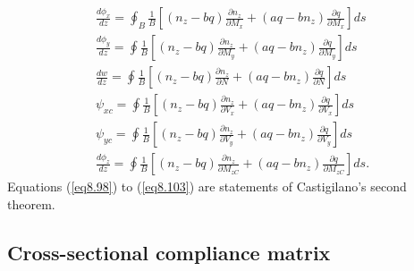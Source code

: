 \documentclass{AeroStructure-ERJohnson}
\begin{document}
\begin{gather}
\frac{d \phi_{x}}{d z}=\oint_{B} \frac{1}{B}\left[\left(n_{z}-b
q\right) \frac{\partial n_{z}}{\partial M_{x}}+\left(a q-b
n_{z}\right) \frac{\partial q}{\partial M_{x}}\right] d
s\label{eq8.98}\\
\frac{d \phi_{y}}{d z}=\oint \frac{1}{B}\left[\left(n_{z}-b
q\right) \frac{\partial n_{z}}{\partial M_{y}}+\left(a q-b
n_{z}\right) \frac{\partial q}{\partial M_{y}}\right] d
s\label{eq8.99}\\
\frac{d w}{d z}=\oint \frac{1}{B}\left[\left(n_{z}-b q\right)
\frac{\partial n_{z}}{\partial N}+\left(a q-b n_{z}\right)
\frac{\partial q}{\partial N}\right] d s\label{eq8.100}\\
\psi_{x c}=\oint \frac{1}{B}\left[\left(n_{z}-b q\right)
\frac{\partial n_{z}}{\partial V_{x}}+\left(a q-b n_{z}\right)
\frac{\partial q}{\partial V_{x}}\right] d s\label{eq8.101}\\
\psi_{y c}=\oint \frac{1}{B}\left[\left(n_{z}-b q\right)
\frac{\partial n_{z}}{\partial V_{y}}+\left(a q-b n_{z}\right)
\frac{\partial q}{\partial V_{y}}\right] d s\label{eq8.102}\\
\frac{d \phi_{z}}{d z}=\oint \frac{1}{B}\left[\left(n_{z}-b
q\right) \frac{\partial n_{z}}{\partial M_{z C}}+\left(a q-b
n_{z}\right) \frac{\partial q}{\partial M_{z C}}\right] d
s.\label{eq8.103}
\end{gather}
Equations (\ref{eq8.98}) to (\ref{eq8.103}) are statements of
Castigilano's second theorem.

\vspace*{8pt}

\clearpage

\subsection{Cross-sectional compliance matrix}\label{sec8.2.4}
\end{document}
